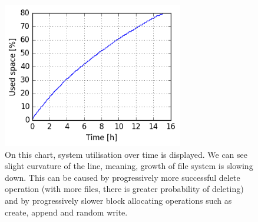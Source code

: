 \documentclass[
  color, %
  table, %
  lof,   %
  lot,   %
]{fithesis3}
\begin{document}
\begin{figure}[!htb]
    \begin{minipage}{\textwidth}
        \centering
        \includegraphics[width=0.7\textwidth]{../charts/HDD_xfs/600.png}
        \caption[Usage of available space of XFS during testing of medium utilisation of HDD]{On this chart, system utilisation over time is displayed. We can see slight curvature of the line, meaning, growth of file system is slowing down. This can be caused by progressively more successful delete operation (with more files, there is greater probability of deleting) and by progressively slower block allocating operations such as create, append and random write.}
\label{fig:usage80_xfs}
    \end{minipage}
\end{figure}
\end{document}
